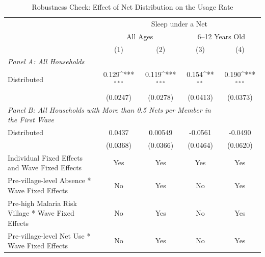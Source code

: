 \documentclass[fleqn,11pt]{article}
\newcommand{\sym}[1]{\rlap{$#1$}}
\def\sym#1{\ifmmode^{#1}\else\(^{#1}\)\fi
}
\begin{document}
\begin{table}[h]
\caption{Robustness Check: Effect of Net Distribution on the Usage Rate}
\label{mqnidd3rd_child_app}
\centering
\begin{adjustbox}{max width=\textwidth}
\begin{threeparttable}
\begin{tabular}{l*{4}{c}}
\hline\hline
	&\multicolumn{4}{c}{Sleep under a Net}\\  \cmidrule(lr){2-5}
	&\multicolumn{2}{c}{All Ages}&\multicolumn{2}{c}{6--12 Years Old}\\ \cmidrule(lr){2-3}  \cmidrule(lr){4-5}
                    &\multicolumn{1}{c}{(1)}&\multicolumn{1}{c}{(2)}&\multicolumn{1}{c}{(3)}&\multicolumn{1}{c}{(4)}\\
    \multicolumn{4}{l}{\textit{Panel A: All Households}}  \\ \hline
Distributed         &       0.129\sym{***}&       0.119\sym{***}&       0.154\sym{**} &       0.190\sym{***}\\
                    &    (0.0247)         &    (0.0278)         &    (0.0413)         &    (0.0373)         \\
   \multicolumn{4}{l}{\textit{Panel B: All Households with More than 0.5 Nets per Member in the First Wave}} \\ \hline


   Distributed         &      0.0437         &     0.00549         &     -0.0561         &     -0.0490         \\
                    &      (0.0368)         &      (0.0366)         &      (0.0464)         &      (0.0620)         \\
Individual Fixed Effects and Wave Fixed Effects &         Yes         &         Yes         &         Yes         &         Yes         \\

Pre-village-level Absence * Wave Fixed Effects&          No         &         Yes         &          No         &         Yes     \\

Pre-high Malaria Risk Village * Wave Fixed Effects&          No         &          Yes         &     No         &         Yes     \\

Pre-village-level Net Use * Wave Fixed Effects&          No         &          Yes         &        No         &         Yes    \\


\end{tabular}
\end{threeparttable}
\end{adjustbox}
\end{table}
\end{document}
